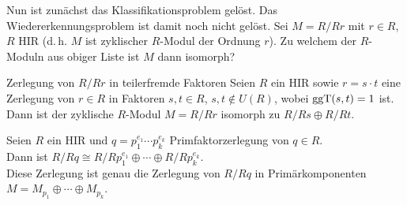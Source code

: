 \begin{Bem}
    Nun ist zunächst das Klassifikationsproblem gelöst.
    Das Wiedererkennungsproblem ist damit noch nicht gelöst.
    Sei $M = R/Rr$ mit $r \in R$, $R$ HIR
    (d.\,h. $M$ ist zyklischer $R$-Modul der Ordnung $r$).
    Zu welchem der $R$-Moduln aus obiger Liste ist $M$ dann isomorph?
\end{Bem}

\begin{Satz}{Zerlegung von $R/Rr$ in teilerfremde Faktoren}
    Seien $R$ ein HIR sowie $r = s \cdot t$ eine Zerlegung von $r \in R$
    in Faktoren $s, t \in R$, $s, t \notin U(R)$, wobei
    $\operatorname{ggT}(s, t) = 1$ ist. \\
    Dann ist der zyklische $R$-Modul $M = R/Rr$ isomorph zu
    $R/Rs \oplus R/Rt$.
\end{Satz}

\begin{Kor}
    Seien $R$ ein HIR und $q = p_1^{e_1} \dotsm p_k^{e_k}$ Primfaktorzerlegung
    von $q \in R$. \\
    Dann ist $R/Rq \cong R/Rp_1^{e_1} \oplus \dotsb \oplus
    R/Rp_k^{e_k}$. \\
    Diese Zerlegung ist genau die Zerlegung von $R/Rq$ in Primärkomponenten
    $M = M_{p_1} \oplus \dotsb \oplus M_{p_k}$.
\end{Kor}

